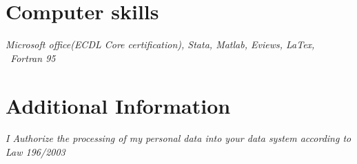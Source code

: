 \documentclass[10pt]{article} %
\begin{document}

\section{Computer skills}
\textit{Microsoft office(ECDL Core certification), Stata, Matlab, Eviews, LaTex, \ Fortran 95}



\section{Additional Information}


\textit{I Authorize the processing of my personal data into your data system according to Law 196/2003}\\


\end{document}
